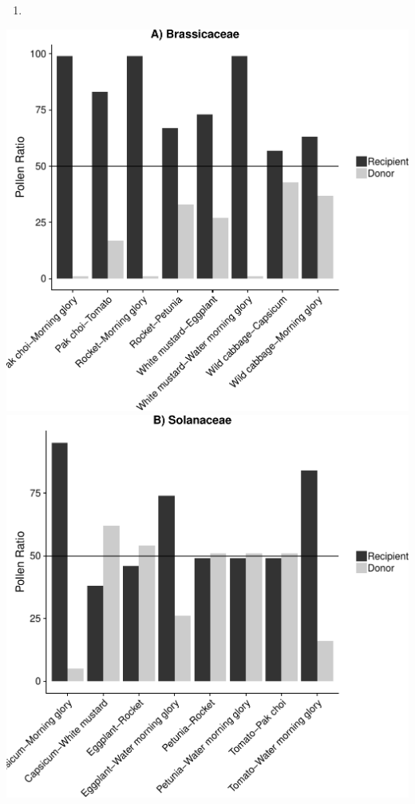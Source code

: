 \documentclass[11pt,a4paper]{article}
\begin{document}
\begin{enumerate}
\def\labelenumi{\arabic{enumi}.}
\setcounter{enumi}{1}
\item
\end{enumerate}

\includegraphics{output/figures/unnamed-chunk-5-1.pdf}
\includegraphics{output/figures/unnamed-chunk-5-2.pdf}
\end{document}
